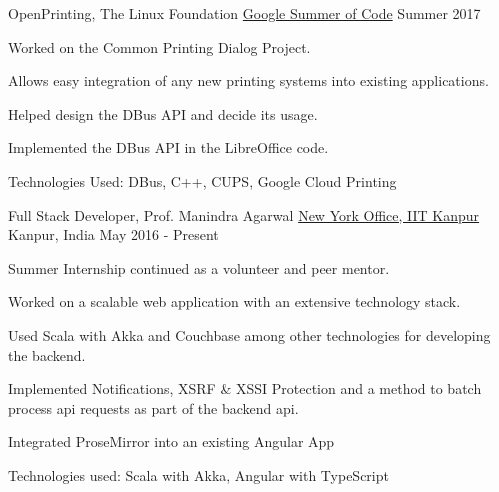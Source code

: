 \begin{cventries}

  \cventry
  {OpenPrinting, The Linux Foundation}
  {\href{https://yashsriv.org/2017/08/gsoc.html}{Google Summer of Code}}
  {}
  {Summer 2017}
  {
    \begin{cvitems}
      \item Worked on the Common Printing Dialog Project.
      \item Allows easy integration of any new printing systems into existing applications.
      \item Helped design the DBus API and decide its usage.
      \item Implemented the DBus API in the LibreOffice code.
      \item Technologies Used: DBus, C++, CUPS, Google Cloud Printing
    \end{cvitems}
  }

  \cventry
  {Full Stack Developer, Prof. Manindra Agarwal}
  {\href{https://yashsriv.org/2016/10/thoughts.html}{New York Office, IIT Kanpur}}
  {Kanpur, India}
  {May 2016 - Present}
  {
    \begin{cvitems}
      \item Summer Internship continued as a volunteer and peer mentor.
      \item Worked on a scalable web application with an extensive technology stack.
      \item Used Scala with Akka and Couchbase among other technologies for
        developing the backend.
      \item	Implemented Notifications, XSRF \& XSSI Protection and a method
        to batch process api requests as part of the backend api.
      \item Integrated ProseMirror into an existing Angular App
      \item Technologies used: Scala with Akka, Angular with TypeScript
    \end{cvitems}
  }

\end{cventries}
